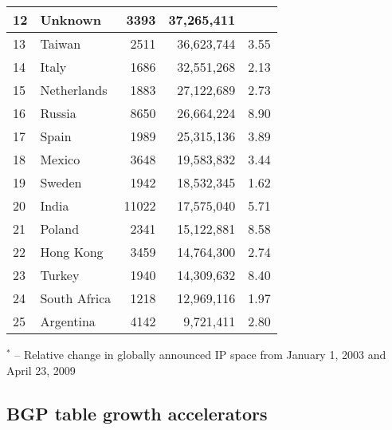 \begin{table*}[p]
\begin{minipage}[t]{0.48\textwidth}
\begin{center}
\begin{tabular}{|l||l|r|r|r|}
12      &       Unknown			&       3393    &       37,265,411      & 				\tabularnewline \hline
13      &       Taiwan  		&       2511    &       36,623,744      & 3.55			\tabularnewline \hline
14      &       Italy   		&       1686    &       32,551,268      & 2.13			\tabularnewline \hline
15      &       Netherlands     &       1883    &       27,122,689      & 2.73			\tabularnewline \hline
16      &       Russia  		&       8650    &       26,664,224      & 8.90			\tabularnewline \hline
17      &       Spain   		&       1989    &       25,315,136      & 3.89			\tabularnewline \hline
18      &       Mexico  		&       3648    &       19,583,832      & 3.44			\tabularnewline \hline
19      &       Sweden  		&       1942    &       18,532,345      & 1.62			\tabularnewline \hline
20      &       India   		&       11022   &       17,575,040      & 5.71			\tabularnewline \hline
21      &       Poland  		&       2341    &       15,122,881      & 8.58			\tabularnewline \hline
22      &       Hong Kong       &       3459    &       14,764,300      & 2.74			\tabularnewline \hline
23      &       Turkey  		&       1940    &       14,309,632      & 8.40			\tabularnewline \hline
24      &       South Africa    &       1218    &       12,969,116      & 1.97			\tabularnewline \hline
25      &       Argentina       &       4142    &       9,721,411       & 2.80			\tabularnewline \hline
	\end{tabular}
	\end{center}
	\small	$^{*}$ -- Relative change in globally announced IP space from January 1, 2003 and April 23, 2009
\end{minipage}

\end{table*}

\clearpage


\subsection{BGP table growth accelerators}

